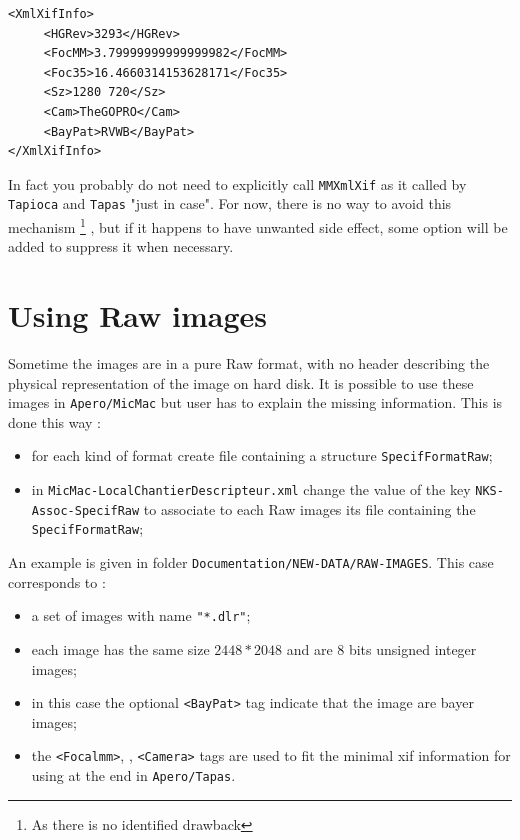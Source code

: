 \begin{verbatim}
<XmlXifInfo>
     <HGRev>3293</HGRev>
     <FocMM>3.79999999999999982</FocMM>
     <Foc35>16.4660314153628171</Foc35>
     <Sz>1280 720</Sz>
     <Cam>TheGOPRO</Cam>
     <BayPat>RVWB</BayPat>
</XmlXifInfo>
\end{verbatim}


In fact you probably do not need to explicitly call  {\tt MMXmlXif} as it called by {\tt Tapioca} and {\tt Tapas}
"just in case". For now, there is no way to avoid this mechanism \footnote{As there is no identified drawback}
, but if it happens to have unwanted side effect,
some option will be added to suppress it when necessary.





\section{Using Raw images}

Sometime the images are in a pure Raw format, with no header describing the physical representation
of the image on hard disk. It is possible to use these images in {\tt Apero/MicMac} but user has
to explain the missing information. This is done this way :

\begin{itemize}
       \item for each kind of format create file containing a structure {\tt SpecifFormatRaw};

       \item in {\tt MicMac-LocalChantierDescripteur.xml} change the value of the key {\tt NKS-Assoc-SpecifRaw} to associate to each Raw images its file containing the {\tt SpecifFormatRaw};

\end{itemize}

An example is given in folder {\tt Documentation/NEW-DATA/RAW-IMAGES}. This case corresponds to :


\begin{itemize}

       \item a set of images with name {\tt "*.dlr"};

       \item each image has the same size $2448 * 2048$ and are $8$ bits unsigned integer images;

       \item in this case the optional {\tt <BayPat>} tag indicate that the image are bayer images;

       \item the {\tt <Focalmm>}, {\tt <FocalEqui35>} , {\tt <Camera>} tags are used to fit the minimal
             xif information for using at the end in {\tt Apero/Tapas}.

\end{itemize}

